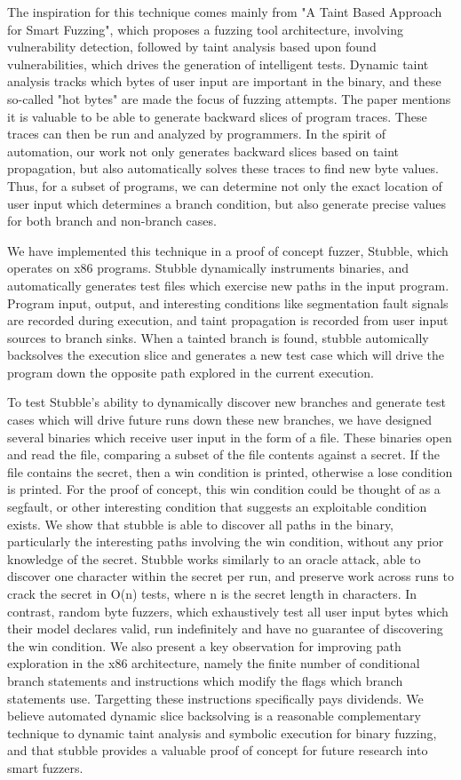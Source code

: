 \documentclass[11pt,expanded,copyright]{fsuthesis}
\begin{document}
The inspiration for this technique comes mainly from "A Taint Based Approach for Smart Fuzzing", which proposes a fuzzing tool architecture, involving vulnerability detection, followed by taint analysis based upon found vulnerabilities, which drives the generation of intelligent tests. Dynamic taint analysis tracks which bytes of user input are important in the binary, and these so-called "hot bytes" are made the focus of fuzzing attempts. The paper mentions it is valuable to be able to generate backward slices of program traces. These traces can then be run and analyzed by programmers. In the spirit of automation, our work not only generates backward slices based on taint propagation, but also automatically solves these traces to find new byte values. Thus, for a subset of programs, we can determine not only the exact location of user input which determines a branch condition, but also generate precise values for both branch and non-branch cases.

We have implemented this technique in a proof of concept fuzzer, Stubble, which operates on x86 programs. Stubble dynamically instruments binaries, and automatically generates test files which exercise new paths in the input program. Program input, output, and interesting conditions like segmentation fault signals are recorded during execution, and taint propagation is recorded from user input sources to branch sinks. When a tainted branch is found, stubble automically backsolves the execution slice and generates a new test case which will drive the program down the opposite path explored in the current execution. 

To test Stubble's ability to dynamically discover new branches and generate test cases which will drive future runs down these new branches, we have designed several binaries which receive user input in the form of a file. These binaries open and read the file, comparing a subset of the file contents against a secret. If the file contains the secret, then a win condition is printed, otherwise a lose condition is printed. For the proof of concept, this win condition could be thought of as a segfault, or other interesting condition that suggests an exploitable condition exists. We show that stubble is able to discover all paths in the binary, particularly the interesting paths involving the win condition, without any prior knowledge of the secret. Stubble works similarly to an oracle attack, able to discover one character within the secret per run, and preserve work across runs to crack the secret in O(n) tests, where n is the secret length in characters. In contrast, random byte fuzzers, which exhaustively test all user input bytes which their model declares valid, run indefinitely and have no guarantee of discovering the win condition. We also present a key observation for improving path exploration in the x86 architecture, namely the finite number of conditional branch statements and instructions which modify the flags which branch statements use. Targetting these instructions specifically pays dividends. We believe automated dynamic slice backsolving is a reasonable complementary technique to dynamic taint analysis and symbolic execution for binary fuzzing, and that stubble provides a valuable proof of concept for future research into smart fuzzers.
\end{document}
